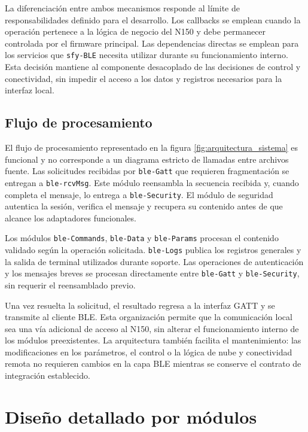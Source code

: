 La diferenciación entre ambos mecanismos responde al límite de responsabilidades definido para el desarrollo. Los callbacks se emplean cuando la operación pertenece a la lógica de negocio del N150 y debe permanecer controlada por el firmware principal. Las dependencias directas se emplean para los servicios que \texttt{sfy-BLE} necesita utilizar durante su funcionamiento interno. Esta decisión mantiene al componente desacoplado de las decisiones de control y conectividad, sin impedir el acceso a los datos y registros necesarios para la interfaz local.

\subsection{Flujo de procesamiento}

El flujo de procesamiento representado en la figura \ref{fig:arquitectura_sistema} es funcional y no corresponde a un diagrama estricto de llamadas entre archivos fuente. Las solicitudes recibidas por \texttt{ble-Gatt} que requieren fragmentación se entregan a \texttt{ble-rcvMsg}. Este módulo reensambla la secuencia recibida y, cuando completa el mensaje, lo entrega a \texttt{ble-Security}. El módulo de seguridad autentica la sesión, verifica el mensaje y recupera su contenido antes de que alcance los adaptadores funcionales.

Los módulos \texttt{ble-Commands}, \texttt{ble-Data} y \texttt{ble-Params} procesan el contenido validado según la operación solicitada. \texttt{ble-Logs} publica los registros generales y la salida de terminal utilizados durante soporte. Las operaciones de autenticación y los mensajes breves se procesan directamente entre \texttt{ble-Gatt} y \texttt{ble-Security}, sin requerir el reensamblado previo.

Una vez resuelta la solicitud, el resultado regresa a la interfaz GATT y se transmite al cliente BLE. Esta organización permite que la comunicación local sea una vía adicional de acceso al N150, sin alterar el funcionamiento interno de los módulos preexistentes. La arquitectura también facilita el mantenimiento: las modificaciones en los parámetros, el control o la lógica de nube y conectividad remota no requieren cambios en la capa BLE mientras se conserve el contrato de integración establecido.


\section{Diseño detallado por módulos}
\label{sec:diseno_modulos}


